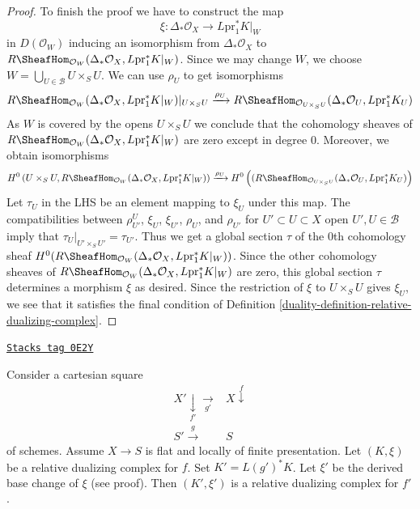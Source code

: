 \begin{proof}
\medskip\noindent
To finish the proof we have to construct the map
$$
\xi : \Delta_*\mathcal{O}_X \longrightarrow L\text{pr}_1^*K|_W
$$
in $D(\mathcal{O}_W)$ inducing an isomorphism from $\Delta_*\mathcal{O}_X$ to
$R\SheafHom_{\mathcal{O}_W}(\Delta_*\mathcal{O}_X, L\text{pr}_1^*K|_W)$.
Since we may change $W$, we choose
$W = \bigcup_{U \in \mathcal{B}} U \times_S U$.
We can use $\rho_U$ to get isomorphisms
$$
R\SheafHom_{\mathcal{O}_W}(
\Delta_*\mathcal{O}_X, L\text{pr}_1^*K|_W)|_{U \times_S U}
\xrightarrow{\rho_U}
R\SheafHom_{\mathcal{O}_{U \times_S U}}(
\Delta_*\mathcal{O}_U, L\text{pr}_1^*K_U)
$$
As $W$ is covered by the opens $U \times_S U$
we conclude that the cohomology sheaves of
$R\SheafHom_{\mathcal{O}_W}(\Delta_*\mathcal{O}_X, L\text{pr}_1^*K|_W)$
are zero except in degree $0$. Moreover, we obtain isomorphisms
$$
H^0\left(U \times_S U, R\SheafHom_{\mathcal{O}_W}(\Delta_*\mathcal{O}_X,
L\text{pr}_1^*K|_W)\right)
\xrightarrow{\rho_U}
H^0\left((R\SheafHom_{\mathcal{O}_{U \times_S U}}(
\Delta_*\mathcal{O}_U, L\text{pr}_1^*K_U)\right)
$$
Let $\tau_U$ in the LHS be an element mapping to $\xi_U$ under this map.
The compatibilities between
$\rho^U_{U'}$, $\xi_U$, $\xi_{U'}$, $\rho_U$, and $\rho_{U'}$
for $U' \subset U \subset X$ open $U', U \in \mathcal{B}$
imply that $\tau_U|_{U' \times_S U'} = \tau_{U'}$.
Thus we get a global section $\tau$ of the $0$th cohomology sheaf
$H^0(R\SheafHom_{\mathcal{O}_W}(\Delta_*\mathcal{O}_X, L\text{pr}_1^*K|_W))$.
Since the other cohomology sheaves of
$R\SheafHom_{\mathcal{O}_W}(\Delta_*\mathcal{O}_X, L\text{pr}_1^*K|_W)$
are zero, this global section $\tau$
determines a morphism $\xi$ as desired. Since the restriction
of $\xi$ to $U \times_S U$ gives $\xi_U$, we see that it
satisfies the final condition of
Definition \ref{duality-definition-relative-dualizing-complex}.
\end{proof}

\begin{lemma}
\label{duality-lemma-base-change-relative-dualizing}
\href{https://stacks.math.columbia.edu/tag/0E2Y}{\texttt{Stacks tag 0E2Y}}

Consider a cartesian square
$$
\begin{array}{cc}X' \underset{f'}{\downarrow}\underset{g'}{\longrightarrow} & X \overset{f}{\downarrow} \\ S' \overset{g}{\longrightarrow} & S\end{array}
$$
of schemes. Assume $X \to S$ is flat and locally of finite presentation.
Let $(K, \xi)$ be a relative dualizing complex for $f$.
Set $K' = L(g')^*K$. Let $\xi'$ be the derived base change of $\xi$
(see proof). Then $(K', \xi')$ is a relative dualizing complex for $f'$.
\end{lemma}

